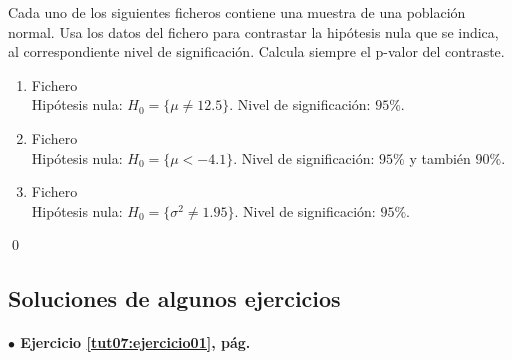 \documentclass[10pt,a4paper]{article}\usepackage[]{graphicx}\usepackage[]{color}
\newcounter {cont01}
\begin{document}
\begin{ejercicio}
\label{tut06:ejercicio16}

Cada uno de los siguientes ficheros contiene una muestra de una población normal. Usa los datos del fichero para contrastar la hipótesis nula que se indica, al correspondiente nivel de significación. Calcula siempre el p-valor del contraste.

\begin{enumerate}



  \item

  Fichero \\
  Hipótesis nula: $H_0=\{\mu\neq12.5\}$.
  Nivel de significación: $95\%$.



  \item

  Fichero \\
  Hipótesis nula: $H_0=\{\mu < -4.1\}$.
  Nivel de significación: $95\%$ y también $90\%$.



  \item

  Fichero \\
  Hipótesis nula: $H_0=\{\sigma^2 \neq 1.95\}$.
  Nivel de significación: $95\%$.



\end{enumerate}

\qed
\end{ejercicio}



\subsection*{Soluciones de algunos ejercicios}
\label{tut07:subsec:SolucionesAlgunosEjercicios}


\paragraph{\bf $\bullet$ Ejercicio \ref{tut07:ejercicio01}, pág. \pageref{tut07:ejercicio01}}
\label{tut07:ejercicio01:sol}\quad\\
\end{document}
